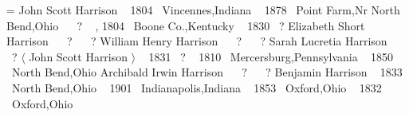 


\Poster[hcenter=true,%
        vcenter=true,%
        clip=pstricks,%
        cropwidth=.4pt]
\vbox{=\vbox{%
{\descfont John Scott Harrison}
\sepline 
{} \btag\ { \oct{} 1804} {\placefont \at\ }{\placefont Vincennes,Indiana}
 \dtag\ { \may{} 1878} {\placefont \at\ }{\placefont Point Farm,Nr North Bend,Ohio}
 \mtag\ {} {\placefont \at\ }{\placefont  ? }
 \btag\ { \sep{} 1804} {\placefont \at\ }{\placefont Boone Co.,Kentucky}
 \dtag\ { \feb{} 1830} {\placefont \at\ }{\placefont  ? }
% 
{\descfont Elizabeth Short Harrison}
\sepline 
{} \btag\ {} {\placefont \at\ }{\placefont  ? }
 \dtag\ {} {\placefont \at\ }{\placefont  ? }
\endsubtree 
{}%
{\descfont William Henry Harrison}
 \btag\ {} {\placefont \at\ }{\placefont  ? }
 \dtag\ {} {\placefont \at\ }{\placefont  ? }
\endsubtree 
{}%
{\descfont Sarah Lucretia Harrison}
\sepline 
{} \btag\ {} {\placefont \at\ }{\placefont  ? }
\endsubtree 
\endsubtree 
{}%
{$\langle$ \descfont John Scott Harrison $\rangle$}
 \mtag\ { \aug{} 1831} {\placefont \at\ }{\placefont  ? }
 \btag\ { \jul{} 1810} {\placefont \at\ }{\placefont Mercersburg,Pennsylvania}
 \dtag\ { \aug{} 1850} {\placefont \at\ }{\placefont North Bend,Ohio}
% 
{\descfont Archibald Irwin Harrison}
\sepline 
{} \btag\ {} {\placefont \at\ }{\placefont  ? }
 \dtag\ {} {\placefont \at\ }{\placefont  ? }
\endsubtree 
{}%
{\descfont Benjamin Harrison}
\sepline 
{} \btag\ { \aug{} 1833} {\placefont \at\ }{\placefont North Bend,Ohio}
 \dtag\ { \mar{} 1901} {\placefont \at\ }{\placefont Indianapolis,Indiana}
 \mtag\ { \oct{} 1853} {\placefont \at\ }{\placefont Oxford,Ohio}
 \btag\ { \oct{} 1832} {\placefont \at\ }{\placefont Oxford,Ohio}
}}
